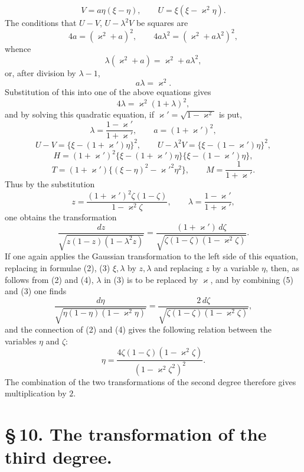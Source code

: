 \documentclass[11pt]{article}
\begin{document}
\[
V=a\eta(\xi-\eta),\qquad U=\xi(\xi-\varkappa^2\eta).
\]
The conditions that $U-V$, $U-\lambda^2V$ be squares are
\[
4a=(\varkappa^2+a)^2,\qquad 4a\lambda^2=(\varkappa^2+a\lambda^2)^2,
\]
whence
\[
\lambda(\varkappa^2+a)=\varkappa^2+a\lambda^2,
\]
or, after division by $\lambda-1$,
\[
a\lambda=\varkappa^2.
\]
Substitution of this into one of the above equations gives
\[
4\lambda=\varkappa^2(1+\lambda)^2,
\]
and by solving this quadratic equation, if $\varkappa'=\sqrt{1-\varkappa^2}$ is put,
\[
\lambda=\frac{1-\varkappa'}{1+\varkappa'},\qquad
a=(1+\varkappa')^2,
\]
\[
U-V=\{\xi-(1+\varkappa')\eta\}^2,\qquad
U-\lambda^2V=\{\xi-(1-\varkappa')\eta\}^2,
\]
\[
H=(1+\varkappa')^2\{\xi-(1+\varkappa')\eta\}\{\xi-(1-\varkappa')\eta\},
\]
\[
T=(1+\varkappa')\{(\xi-\eta)^2-\varkappa'^2\eta^2\},\qquad
M=\frac1{1+\varkappa'}.
\]
Thus by the substitution
\begin{equation}
z=\frac{(1+\varkappa')^2\zeta(1-\zeta)}{1-\varkappa^2\zeta},
\qquad
\lambda=\frac{1-\varkappa'}{1+\varkappa'},
\tag{4}
\end{equation}
one obtains the transformation
\begin{equation}
\frac{dz}{\sqrt{z(1-z)(1-\lambda^2z)}}
=
\frac{(1+\varkappa')\,d\zeta}{\sqrt{\zeta(1-\zeta)(1-\varkappa^2\zeta)}}.
\tag{5}
\end{equation}
If one again applies the Gaussian transformation to the left side of this equation, replacing in formulae (2), (3) $\xi,\lambda$ by $z,\lambda$ and replacing $z$ by a variable $\eta$, then, as follows from (2) and (4), $\lambda$ in (3) is to be replaced by $\varkappa$, and by combining (5) and (3) one finds
\begin{equation}
\frac{d\eta}{\sqrt{\eta(1-\eta)(1-\varkappa^2\eta)}}
=
\frac{2\,d\zeta}{\sqrt{\zeta(1-\zeta)(1-\varkappa^2\zeta)}},
\tag{6}
\end{equation}
and the connection of (2) and (4) gives the following relation between the variables $\eta$ and $\zeta$:
\begin{equation}
\eta=\frac{4\zeta(1-\zeta)(1-\varkappa^2\zeta)}
{(1-\varkappa^2\zeta^2)^2}.
\tag{7}
\end{equation}
The combination of the two transformations of the second degree therefore gives multiplication by $2$.

\section*{\S\,10. The transformation of the third degree.}
\end{document}
